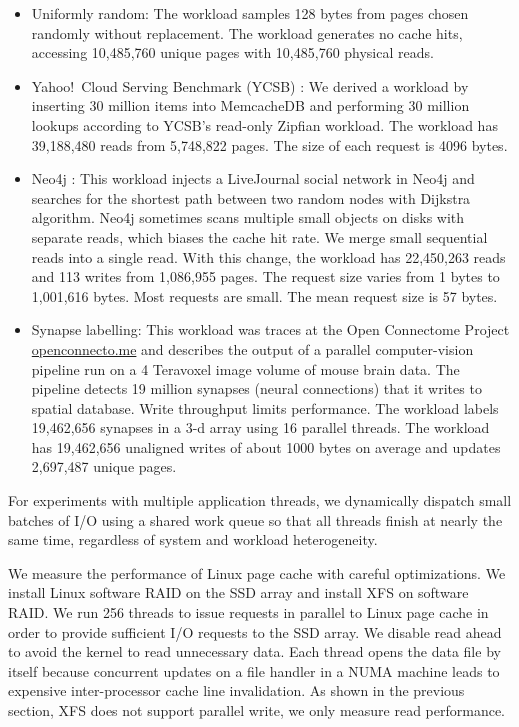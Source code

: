 \begin{itemize}
\addtolength{\itemsep}{-5pt}
\item Uniformly random: The workload samples 128 bytes from pages chosen
  randomly without replacement.  The workload generates no cache hits, 
	accessing 10,485,760 unique pages with 10,485,760 physical reads.
\item Yahoo!~Cloud Serving Benchmark (YCSB) \cite{ycsb}:  We derived a 
  workload by inserting 30 million items into MemcacheDB 
  and performing 30 million lookups according to YCSB's read-only Zipfian workload.
	The workload has 39,188,480 reads from 5,748,822 pages. The size of each
	request is 4096 bytes.  
\item Neo4j \cite{neo4j}: This workload injects a LiveJournal social
	network \cite{livejournal} in Neo4j and searches for the shortest path
	between two random nodes with Dijkstra algorithm. 
 Neo4j sometimes scans multiple small objects on disks with separate reads, which biases 
 the cache hit rate.   We merge small sequential reads into
	a single read. With this change, the workload has 22,450,263 reads and
	113 writes from 1,086,955 pages. The request size varies from 1 bytes
	to 1,001,616 bytes. Most requests are small.  The mean request size
	is 57 bytes.
\item Synapse labelling: This workload was traces at the Open Connectome Project \url{openconnecto.me}
  and describes the output of a parallel computer-vision pipeline run on a 4 Teravoxel image volume of 
  mouse brain data.  The pipeline detects 19 million synapses (neural connections) that it writes to 
  spatial database.  Write throughput limits performance.  The workload labels 19,462,656 synapses in a 
  3-d array 
  using 16 parallel threads.  The workload has 19,462,656 unaligned writes of about 1000 bytes on average
  and updates 2,697,487 unique pages.
\end{itemize}
\vspace{-10pt}
For experiments with multiple application threads, we dynamically dispatch 
small batches of I/O using a shared work queue so that all threads finish at 
nearly the same time, regardless of system and workload heterogeneity.

We measure the performance of Linux page cache with careful optimizations.
We install Linux software RAID on the SSD array and install XFS on software
RAID. We run 256 threads to issue requests in parallel to
Linux page cache in order to provide sufficient I/O requests to the SSD array.
We disable read ahead to avoid the kernel to read unnecessary data.
Each thread opens the data file by itself because concurrent updates on a file handler
in a NUMA machine leads to expensive inter-processor cache line invalidation.
As shown in the previous section, XFS does not support parallel write, we only
measure read performance. 


